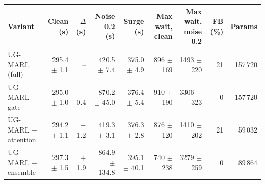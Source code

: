 \begin{tabular}{lrrrrrrrr}
\toprule
Variant & Clean (s) & $\Delta$ (s) & Noise 0.2 (s) & Surge (s) & Max wait, clean & Max wait, noise 0.2 & FB (\%) & Params \\
\midrule
UG-MARL (full) & 295.4 $\pm$ 1.1 & -- & 420.5 $\pm$ 7.4 & 375.0 $\pm$ 4.9 & 896 $\pm$ 169 & 1493 $\pm$ 220 & 21 & 157\,720 \\
UG-MARL $-$gate & 295.0 $\pm$ 1.0 & $-$0.4 & 870.2 $\pm$ 45.0 & 376.4 $\pm$ 5.4 & 910 $\pm$ 190 & 3306 $\pm$ 323 & 0 & 157\,720 \\
UG-MARL $-$attention & 294.2 $\pm$ 1.1 & $-$1.2 & 419.3 $\pm$ 3.1 & 376.3 $\pm$ 2.8 & 876 $\pm$ 120 & 1410 $\pm$ 202 & 21 & 59\,032 \\
UG-MARL $-$ensemble & 297.3 $\pm$ 1.5 & $+$1.9 & 864.9 $\pm$ 134.8 & 395.1 $\pm$ 40.1 & 740 $\pm$ 238 & 3279 $\pm$ 259 & 0 & 89\,864 \\
\bottomrule
\end{tabular}
